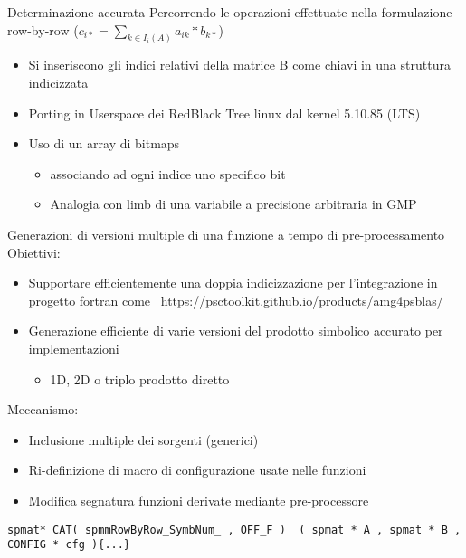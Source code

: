 \begin{frame} {Determinazione accurata}
Percorrendo le operazioni effettuate nella formulazione row-by-row	
($c_{i*} = \sum\limits_{k \in I_i(A)}  a_{ik} \ast  b_{k*}$)
\begin{itemize}
	\item	Si inseriscono gli indici relativi della matrice B 
	come chiavi in una struttura indicizzata
	\item	Porting in Userspace dei RedBlack Tree linux dal kernel 5.10.85 (LTS)
	\item	Uso di un array di bitmaps
	\begin{itemize}
		\item	associando ad ogni indice uno specifico bit
		\item	Analogia con limb di una variabile a precisione arbitraria in GMP
	\end{itemize}
\end{itemize}
\end{frame}

\begin{frame}[fragile] {Generazioni di versioni multiple di una funzione a tempo di pre-processamento}
Obiettivi:
\begin{itemize}
	\item	Supportare efficientemente una doppia indicizzazione 
	per l'integrazione in progetto fortran come 
	\url{https://psctoolkit.github.io/products/amg4psblas/}
	\item	Generazione efficiente di varie versioni del prodotto simbolico accurato per implementazioni
	\begin{itemize}
		\item	1D, 2D o triplo prodotto diretto
	\end{itemize}
\end{itemize}
\voidLine
Meccanismo:
\begin{itemize}
	\item	Inclusione multiple dei sorgenti (generici)
	\item	Ri-definizione di macro di configurazione usate nelle funzioni
	\item	Modifica segnatura funzioni derivate mediante pre-processore
\end{itemize}
\voidLine
\begin{lstlisting}
spmat* CAT( spmmRowByRow_SymbNum_ , OFF_F )  ( spmat * A , spmat * B , CONFIG * cfg ){...} 
\end{lstlisting}

\end{frame}

